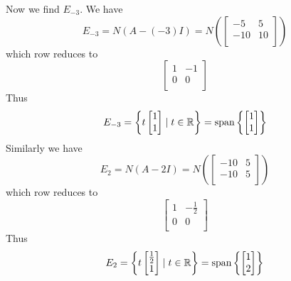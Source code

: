 \documentclass{article}
\DeclareMathOperator{\spn}{span}
\begin{document}
\begin{example}
  Now we find $E_{-3}$. We have \[
    E_{-3} = N(A -(-3)I) = N\left(
      \begin{bmatrix}
        -5 & 5\\
        -10 & 10\\
    \end{bmatrix}\right)
  \] which row reduces to \[
    \begin{bmatrix}
      1 & -1\\
      0 & 0\\
    \end{bmatrix}
  \] Thus \[
    E_{-3} = \left\{ t
      \begin{bmatrix}
        1\\1\\
    \end{bmatrix}\mid t \in \R \right\} = \spn \left\{
      \begin{bmatrix}
        1\\1\\
    \end{bmatrix}\right\}
  \]
  Similarly we have \[
    E_2 = N(A - 2I) = N\left(
      \begin{bmatrix}
        -10 & 5\\
        -10 & 5\\
    \end{bmatrix}\right)
  \] which row reduces to \[
    \begin{bmatrix}
      1 & -\frac{1}{2}\\
      0 & 0\\
    \end{bmatrix}
  \] Thus \[
    E_{2} = \left\{ t
      \begin{bmatrix}
        \frac{1}{2}\\1\\
    \end{bmatrix}\mid t \in \R \right\} = \spn \left\{
      \begin{bmatrix}
        1\\2\\
    \end{bmatrix}\right\}
  \]
\end{example}
\end{document}
